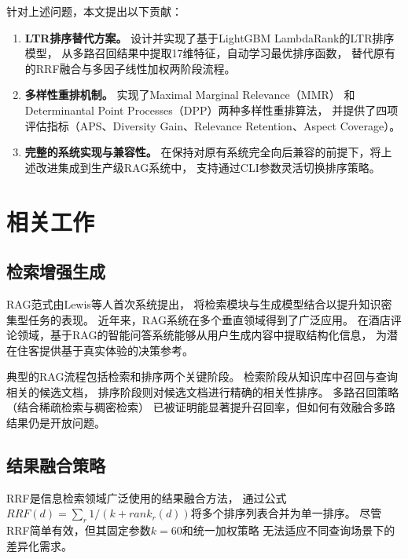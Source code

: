 \documentclass[10pt,a4paper]{article}
\begin{document}
针对上述问题，本文提出以下贡献：

\begin{enumerate}[leftmargin=*]
    \item \textbf{LTR排序替代方案。}
    设计并实现了基于LightGBM LambdaRank\cite{ke2017lightgbm}的LTR排序模型，
    从多路召回结果中提取17维特征，自动学习最优排序函数，
    替代原有的RRF融合与多因子线性加权两阶段流程。

    \item \textbf{多样性重排机制。}
    实现了Maximal Marginal Relevance（MMR）\cite{carbonell1998mmr}
    和Determinantal Point Processes（DPP）\cite{kulesza2012dpp}两种多样性重排算法，
    并提供了四项评估指标（APS、Diversity Gain、Relevance Retention、Aspect Coverage）。

    \item \textbf{完整的系统实现与兼容性。}
    在保持对原有系统完全向后兼容的前提下，将上述改进集成到生产级RAG系统中，
    支持通过CLI参数灵活切换排序策略。
\end{enumerate}

\section{相关工作}

\subsection{检索增强生成}

RAG范式由Lewis等人\cite{lewis2020rag}首次系统提出，
将检索模块与生成模型结合以提升知识密集型任务的表现。
近年来，RAG系统在多个垂直领域得到了广泛应用\cite{gao2023rag,cuconasu2024rag}。
在酒店评论领域，基于RAG的智能问答系统能够从用户生成内容中提取结构化信息，
为潜在住客提供基于真实体验的决策参考。

典型的RAG流程包括检索和排序两个关键阶段。
检索阶段从知识库中召回与查询相关的候选文档，
排序阶段则对候选文档进行精确的相关性排序。
多路召回策略\cite{ma2024hybrid}（结合稀疏检索与稠密检索）
已被证明能显著提升召回率，但如何有效融合多路结果仍是开放问题。

\subsection{结果融合策略}

RRF\cite{cormack2009rrf}是信息检索领域广泛使用的结果融合方法，
通过公式$RRF(d) = \sum_r 1/(k + rank_r(d))$将多个排序列表合并为单一排序。
尽管RRF简单有效，但其固定参数$k=60$和统一加权策略
无法适应不同查询场景下的差异化需求。
\end{document}
